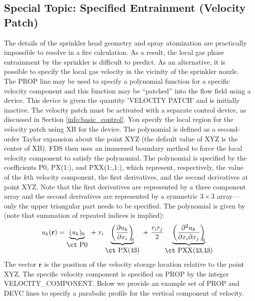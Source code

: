 \documentclass[11pt]{book}
\begin{document}
\subsection{Special Topic: Specified Entrainment (Velocity Patch)}
\label{info:velocity_patch}

The details of the sprinkler head geometry and spray atomization are practically impossible to resolve in a fire calculation.  As a result, the local gas phase entrainment by the sprinkler is difficult to predict.  As an alternative, it is possible to specify the local gas velocity in the vicinity of the sprinkler nozzle.  The {\ct PROP} line may be used to specify a polynomial function for a specific velocity component and this function may be ``patched'' into the flow field using a device.  This device is given the quantity {\ct 'VELOCITY PATCH'} and is initially inactive.  The velocity patch must be activated with a separate control device, as discussed in Section \ref{info:basic_control}.  You specify the local region for the velocity patch using {\ct XB} for the device.  The polynomial is defined as a second-order Taylor expansion about the point {\ct XYZ} (the default value of {\ct XYZ} is the center of {\ct XB}).  FDS then uses an immersed boundary method to force the local velocity component to satisfy the polynomial.  The polynomial is specified by the coefficients {\ct P0}, {\ct PX(1\!:)}, and {\ct PXX(1\!:,1\!:)}, which represent, respectively, the value of the $k$th velocity component, the first derivatives, and the second derivatives at point {\ct XYZ}.  Note that the first derivatives are represented by a three component array and the second derivatives are represented by a symmetric $3 \times 3$ array---only the upper triangular part needs to be specified.  The polynomial is given by (note that summation of repeated indices is implied):
\begin{equation}
u_k(\mathbf{r}) = \underbrace{(u_k)_0}_{\mbox{\ct P0}} \,\,+\,\, r_i \underbrace{\left( \frac{\partial u_k}{\partial x_i} \right)_{\!\!\!0}}_{\mbox{\ct PX(1\!:\!3)}} \,\,+\,\,\frac{ r_i r_j}{2} \underbrace{\left(\frac{\partial^2 u_k}{\partial x_i \partial x_j}\right)_{\!\!\!0}}_{\mbox{\ct PXX(1\!:\!3,1\!:\!3)}}
\end{equation}
The vector $\mathbf{r}$ is the position of the velocity storage location relative to the point {\ct XYZ}.  The specific velocity component is specified on {\ct PROP} by the integer {\ct VELOCITY\_COMPONENT}.  Below we provide an example set of {\ct PROP} and {\ct DEVC} lines to specify a parabolic profile for the vertical component of velocity.
\end{document}
